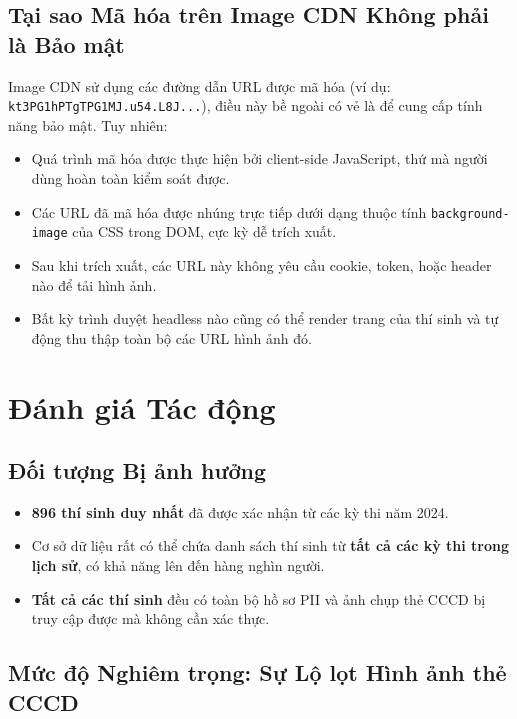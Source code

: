 \documentclass[12pt,a4paper]{article}
\begin{document}
\subsection{Tại sao Mã hóa trên Image CDN Không phải là Bảo mật}

Image CDN sử dụng các đường dẫn URL được mã hóa (ví dụ: \texttt{kt3PG1hPTgTPG1MJ.u54.L8J...}), điều này bề ngoài có vẻ là để cung cấp tính năng bảo mật. Tuy nhiên:
\begin{itemize}
    \item Quá trình mã hóa được thực hiện bởi client-side JavaScript, thứ mà người dùng hoàn toàn kiểm soát được.
    \item Các URL đã mã hóa được nhúng trực tiếp dưới dạng thuộc tính \texttt{background-image} của CSS trong DOM, cực kỳ dễ trích xuất.
    \item Sau khi trích xuất, các URL này không yêu cầu cookie, token, hoặc header nào để tải hình ảnh.
    \item Bất kỳ trình duyệt headless nào cũng có thể render trang của thí sinh và tự động thu thập toàn bộ các URL hình ảnh đó.
\end{itemize}

\section{Đánh giá Tác động}
\label{sec:impact}

\subsection{Đối tượng Bị ảnh hưởng}

\begin{itemize}[noitemsep]
    \item \textbf{896 thí sinh duy nhất} đã được xác nhận từ các kỳ thi năm 2024.
    \item Cơ sở dữ liệu rất có thể chứa danh sách thí sinh từ \textbf{tất cả các kỳ thi trong lịch sử}, có khả năng lên đến hàng nghìn người.
    \item \textbf{Tất cả các thí sinh} đều có toàn bộ hồ sơ PII và ảnh chụp thẻ CCCD bị truy cập được mà không cần xác thực.
\end{itemize}

\subsection{Mức độ Nghiêm trọng: Sự Lộ lọt Hình ảnh thẻ CCCD}
\end{document}
